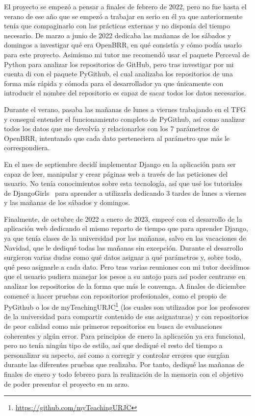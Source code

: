 \documentclass[a4paper, 12pt]{book}
\begin{document}
El proyecto se empezó a pensar a finales de febrero de 2022, pero no fue hasta el verano de ese año que se empezó a trabajar en serio en él ya que anteriormente tenía que compaginarlo con las prácticas externas y no disponía del tiempo necesario. 
De marzo a junio de 2022 dedicaba las mañanas de los sábados y domingos a investigar qué era OpenBRR, en qué consistía y cómo podía usarlo para este proyecto. Asimismo mi tutor me recomendó usar el paquete Perceval\cite{website:Perceval}  de Python para analizar los repositorios de GitHub, pero tras investigar por mi cuenta di con el paquete PyGithub, el cual analizaba los repositorios de una forma más rápida y cómoda para el desarrollador ya que únicamente con introducir el nombre del repositorio es capaz de sacar todos los datos necesarios.

Durante el verano, pasaba las mañanas de lunes a viernes trabajando en el TFG y conseguí entender el funcionamiento completo de PyGithub, así como analizar todos los datos que me devolvía y relacionarlos con los 7 parámetros de OpenBRR, intentando que cada dato perteneciera al parámetro que más le correspondiera.

En el mes de septiembre decidí implementar Django en la aplicación para ser capaz de leer, manipular y crear páginas web a través de las peticiones del usuario. No tenía conocimientos sobre esta tecnología, así que usé los tutoriales de DjangoGirls~\cite{website:DjangoGirls} para aprender a utilizarla dedicando 3 tardes de lunes a viernes y las mañanas de los sábados y domingos.

Finalmente, de octubre de 2022 a enero de 2023, empecé con el desarrollo de la aplicación web dedicando el mismo reparto de tiempo que para aprender Django, ya que tenía clases de la universidad por las mañanas, salvo en las vacaciones de Navidad, que le dediqué todas las mañanas sin excepción. Durante el desarrollo surgieron varias dudas como qué datos asignar a qué parámetros y, sobre todo, qué peso asignarle a cada dato. Pero tras varias reuniones con mi tutor decidimos que el usuario pudiera manejar los pesos a su antojo para así poder centrarse en analizar los repositorios de la forma que más le convenga.
A finales de diciembre comencé a hacer pruebas con repositorios profesionales, como el propio de PyGithub o los de myTeachingURJC\footnote{\url{https://github.com/myTeachingURJC}} (los cuales son utilizados por los profesores de la universidad para compartir contenido de sus asignaturas) y con repositorios de peor calidad como mis primeros repositorios en busca de evaluaciones coherentes y algún error. Para principios de enero la aplicación ya era funcional, pero no tenía ningún tipo de estilo, así que dediqué el resto del tiempo a personalizar su aspecto, así como a corregir y controlar errores que surgían durante las diferentes pruebas que realizaba.
Por tanto, dediqué las mañanas de finales de enero y todo febrero para la realización de la memoria con el objetivo de poder presentar el proyecto en m	arzo.
\end{document}
